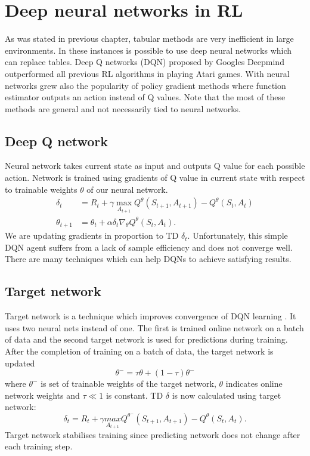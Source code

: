 \clearpage
\section{Deep neural networks in RL}
As was stated in previous chapter, tabular methods are very inefficient in large environments. In these instances is possible to use deep neural networks which can replace tables. Deep Q networks (DQN) proposed by Googles Deepmind \cite{mnih2015} outperformed all previous RL algorithms in playing Atari games. With neural networks grew also the popularity of policy gradient methods where function estimator outputs an action instead of Q values. Note that the most of these methods are general and not necessarily tied to neural networks.

\subsection{Deep Q network}
Neural network takes current state as input and outputs Q value for each possible action. Network is trained using gradients of Q value in current state with respect to trainable weights $\theta$ of our neural network.
\begin{align} \label{eq:qlearn}
\delta_t &= R_{t} + \gamma \underset{A_{t+1}}{\max}Q^\theta(S_{t+1}, A_{t+1}) - Q^\theta(S_t, A_t)\\
\theta_{t+1} &= \theta_t + \alpha \delta_t \nabla_\theta Q^\theta (S_t, A_t).
\end{align}
We are updating gradients in proportion to TD $\delta_t$. Unfortunately, this simple DQN agent suffers from a lack of sample efficiency and does not converge well. There are many techniques which can help DQNs to achieve satisfying results.

\subsection{Target network}
Target network is a technique which improves convergence of DQN learning \cite{mnih2015}. It uses two neural nets instead of one. The first is trained online network on a batch of data and the second target network is used for predictions during training. After the completion of training on a batch of data, the target network is updated
\begin{equation}
\theta^- = \tau \theta + (1-\tau)\theta^-
\end{equation}
where $\theta^-$ is set of trainable weights of the target network, $\theta$ indicates online network weights and $\tau \ll 1$ is constant.
TD $\delta$ is now calculated using target network:
\begin{equation}
\delta_t = R_{t} + \gamma \underset{A_{t+1}}{max}Q^{\theta^-}(S_{t+1}, A_{t+1}) - Q^\theta(S_t, A_t). 
\end{equation}
Target network stabilises training since predicting network does not change after each training step.

